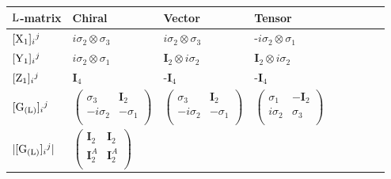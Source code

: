 \documentclass[12pt]{article}
\def\rL{{\rm L}}
\let\bm\relax
\newcommand{\bm}[1]{{\boldsymbol{#1}}}
\begin{document}
\begin{table}[H]
\begin{center}
\begin{tabular}{|m{4.5em}|m{4cm}|m{4cm}|m{4cm}|m{4cm}|m{4cm}|m{1cm}|m{1cm}|m{1cm}|}
\hline
  $\bm\rL$-matrix  
  & Chiral 
  & Vector 
  & Tensor \\   
  \hline
  $[{\bm{\rm X}}_1]_{i}{}^{j}$
  & $i\sigma_2\otimes\sigma_3$ 
  & $i\sigma_2\otimes\sigma_3$
  & -$i\sigma_2\otimes\sigma_1$ \\ 
  \hline
  $[{\bm{\rm Y}}_1]_{i}{}^{j}$
  & $i\sigma_2\otimes \sigma_1$
  & $\mathbf{I}_2\otimes i\sigma_2$  
  & $\mathbf{I}_2\otimes i\sigma_2$ 
 \\ 
  \hline
  $[{\bm{\rm Z}}_1]_{i}{}^{j}$
  & $\mathbf{I}_4$
  & -$\mathbf{I}_4$ 
  & -$\mathbf{I}_4$
 \\ 
  \hline
  $[{\bm{\rm G_{(L)}}}]_{i}{}^{j}$
  & $\begin{pmatrix}
  \sigma_3&\mathbf{I}_2\\
  -i\sigma_2& -\sigma_1\\
  \end{pmatrix}$
  & $\begin{pmatrix}
  \sigma_3&\mathbf{I}_2\\
  -i\sigma_2& -\sigma_1\\
  \end{pmatrix}$ 
  & $\begin{pmatrix}
  \sigma_1&-\mathbf{I}_2\\
  i\sigma_2& \sigma_3\\
  \end{pmatrix}$ 
  \\ 
  \hline
$|[{\bm{\rm G_{(L)}}}]_{i}{}^{j}|$& 
$\begin{pmatrix}
\mathbf{I}_2&\mathbf{I}_2 \\
\mathbf{I}^A_2&\mathbf{I}^A_2 \\
\end{pmatrix}$&

\end{tabular}
\end{center}
\end{table}
\end{document}

